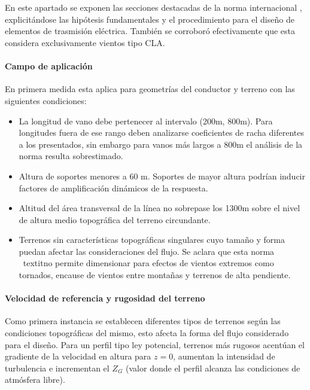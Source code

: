 \chapter{}\label{Ape2}

En este apartado se exponen las secciones destacadas de la norma internacional \cite{IEC60826}, explicitándose las hipótesis fundamentales y el procedimiento para el diseño de elementos de trasmisión eléctrica. También se corroboró efectivamente que esta considera exclusivamente vientos tipo CLA.

\subsubsection{Campo de aplicación}
En primera medida esta aplica para geometrías del conductor y terreno con las siguientes condiciones:

\begin{itemize}
	\item La longitud de vano debe pertenecer al intervalo (200\vspace{0.1cm}m, 800\vspace{0.1cm}m). Para longitudes fuera de ese rango deben analizarse coeficientes de racha diferentes a los presentados, sin embargo para vanos más largos a 800m el análisis de la norma resulta sobrestimado.
	\item Altura de soportes menores a 60 \vspace{0.1cm}m. Soportes de mayor altura podrían inducir factores de amplificación dinámicos de la respuesta.
	\item Altitud del área transversal de la línea no sobrepase los 1300\vspace{0.1cm}m sobre el nivel de altura medio topográfica del terreno circundante.
	\item Terrenos  sin características topográficas singulares cuyo tamaño y forma puedan afectar las consideraciones del flujo. Se aclara que esta norma \ textit{no permite dimensionar para efectos de vientos extremos como tornados, encause de vientos entre montañas y terrenos de alta pendiente. }
\end{itemize}

\subsubsection{Velocidad de referencia y rugosidad del terreno}
Como primera instancia se establecen diferentes tipos de terrenos según las condiciones topográficas del mismo, esto afecta la forma del flujo considerado para el diseño. Para un perfil tipo ley potencial, terrenos más rugosos acentúan el gradiente de la velocidad en altura para $z=0$,  aumentan la intensidad de turbulencia e incrementan el $Z_G$ (valor donde el perfil alcanza las condiciones de atmósfera libre). 


